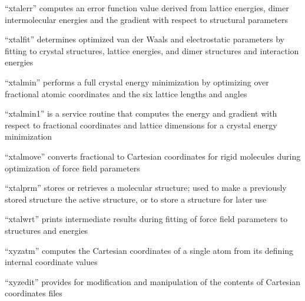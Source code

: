 \documentclass[letterpaper,11pt,english]{sphinxmanual}
\begin{document}
\sphinxAtStartPar
“xtalerr” computes an error function value derived from lattice energies, dimer intermolecular energies and the gradient with respect to structural parameters

\sphinxAtStartPar
{}

\sphinxAtStartPar
“xtalfit” determines optimized van der Waals and electrostatic parameters by fitting to crystal structures, lattice energies, and dimer structures and interaction energies

\sphinxAtStartPar
{}

\sphinxAtStartPar
“xtalmin” performs a full crystal energy minimization by optimizing over fractional atomic coordinates and the six lattice lengths and angles

\sphinxAtStartPar
{}

\sphinxAtStartPar
“xtalmin1” is a service routine that computes the energy and gradient with respect to fractional coordinates and lattice dimensions for a crystal energy minimization

\sphinxAtStartPar
{}

\sphinxAtStartPar
“xtalmove” converts fractional to Cartesian coordinates for rigid molecules during optimization of force field parameters

\sphinxAtStartPar
{}

\sphinxAtStartPar
“xtalprm” stores or retrieves a molecular structure; used to make a previously stored structure the active structure, or to store a structure for later use

\sphinxAtStartPar
{}

\sphinxAtStartPar
“xtalwrt” prints intermediate results during fitting of force field parameters to structures and energies

\sphinxAtStartPar
{}

\sphinxAtStartPar
“xyzatm” computes the Cartesian coordinates of a single atom from its defining internal coordinate values

\sphinxAtStartPar
{}

\sphinxAtStartPar
“xyzedit” provides for modification and manipulation of the contents of Cartesian coordinates files

\sphinxAtStartPar
{}
\end{document}

